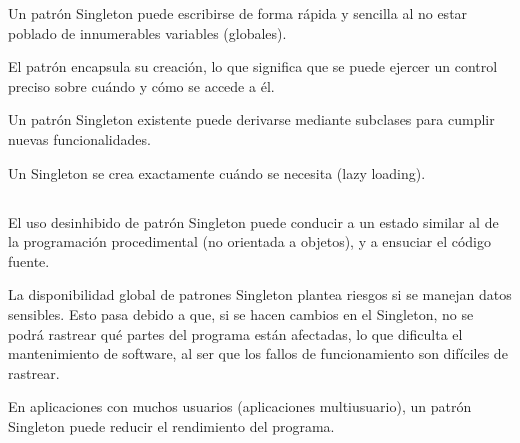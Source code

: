 \documentclass[10pt,a4paper]{article} %
\begin{document}
\begin{itemize}
	{\large
	    \item Un patr{\' o}n Singleton puede escribirse de forma r{\' a}pida y sencilla al no estar poblado de innumerables variables (globales).
	    \item El patr{\' o}n encapsula su creaci{\' o}n, lo que significa que se puede ejercer un control preciso sobre cu{\' a}ndo y c{\' o}mo se accede a {\' e}l.
	    \item Un patr{\' o}n Singleton existente puede derivarse mediante subclases para cumplir nuevas funcionalidades.
	    \item Un Singleton se crea exactamente cu{\' a}ndo se necesita (lazy loading).}
\end{itemize}


\subsection{}

\begin{itemize}
	{\large
	    \item El uso desinhibido de patr{\' o}n Singleton puede conducir a un estado similar al de la programaci{\' o}n procedimental (no orientada a objetos), y a ensuciar el c{\' o}digo fuente.
	    \item La disponibilidad global de patrones Singleton plantea riesgos si se manejan datos sensibles. Esto pasa debido a que, si se hacen cambios en el Singleton, no se podr{\' a} rastrear qu{\' e} partes del programa est{\' a}n afectadas, lo que dificulta el mantenimiento de software, al ser que los fallos de funcionamiento son dif{\' i}ciles de rastrear. 
	    \item En aplicaciones con muchos usuarios (aplicaciones multiusuario), un patr{\' o}n Singleton puede reducir el rendimiento del programa.}
\end{itemize}

\end{document}
